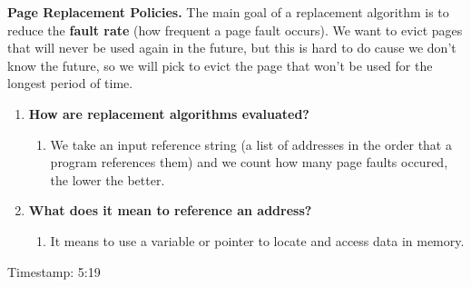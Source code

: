 \documentclass[12pt]{article}
\begin{document}
\vspace{1em}
{\bf Page Replacement Policies.} {The main goal of a replacement algorithm is to reduce the {\bf fault rate} (how frequent a page fault occurs). We want to evict pages that will never be used again in the future, but this is hard to do cause we don't know the future, so we will pick to evict the page that won't be used for the longest period of time. }
    \begin{enumerate}
        \item[]{\bf How are replacement algorithms evaluated?}
        \vspace{-0.5em}
        \begin{enumerate}
            \item[] We take an input reference string (a list of addresses in the order that a program references them) and we count how many page faults occured, the lower the better.
        
        \end{enumerate}
        \item[]{\bf What does it mean to reference an address? }
        \vspace{-0.5em}
        \begin{enumerate}
            \item[] It means to use a variable or pointer to locate and access data in memory. 
        \end{enumerate}

    \end{enumerate}
Timestamp: 5:19
\end{document}
